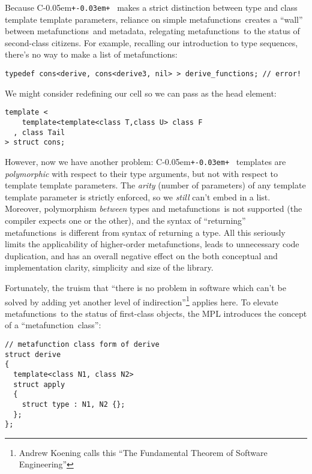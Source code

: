 \documentclass{kapproc}
\newcommand{\Cpp}{C\kern-0.05em\texttt{+\kern-0.03em+}%
}
\newcommand{\mfn}{meta\-func\-tion}
\newcommand{\mfns}{meta\-func\-tions}
\newcommand{\mdat}{meta\-data}
\begin{document}
Because \Cpp\ makes a strict distinction between type and class
template template parameters, reliance on simple \mfns\ creates a
``wall'' between \mfns\ and \mdat, relegating \mfns\ to the
status of second-class citizens. For example, recalling our
introduction to type sequences, there's no way to make a 
list of \mfns:

{\small
\begin{codesamp}\begin{verbatim}
typedef cons<derive, cons<derive3, nil> > derive_functions; // error!
\end{verbatim}
\end{codesamp}
}

We might consider redefining our  cell so we can pass
 as the head element:

{\small
\begin{codesamp}\begin{verbatim}
template <
    template<template<class T,class U> class F
  , class Tail
> struct cons;
\end{verbatim}
\end{codesamp}
}

However, now we have another problem: \Cpp\ templates are
\emph{polymorphic} with respect to their type arguments, but not with
respect to template template parameters. The \emph{arity} (number of
parameters) of any template template parameter is strictly enforced,
so we \emph{still} can't embed  in a 
list. Moreover, polymorphism \emph{between} types and \mfns\ is not
supported (the compiler expects one or the other), and the syntax of
``returning'' \mfns\ is different from syntax of returning a type. All
this seriously limits the applicability of higher-order \mfns, leads
to unnecessary code duplication, and has an overall negative effect on
the both conceptual and implementation clarity, simplicity and size of
the library.

Fortunately, the truism that ``there is no problem in software
which can't be solved by adding yet another level of
indirection''\footnote{Andrew Koening calls this ``The Fundamental
Theorem of Software Engineering''} applies here. To elevate \mfns\ to
the status of first-class objects, the MPL introduces the concept of a
``\mfn\ class'':

{\small
\begin{codesamp}\begin{verbatim}
// metafunction class form of derive
struct derive
{
  template<class N1, class N2>
  struct apply
  {
    struct type : N1, N2 {};
  };
};
\end{verbatim}
\end{codesamp}
}
\end{document}
